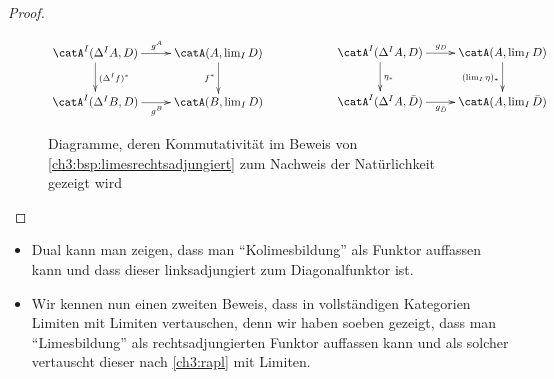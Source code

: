 \begin{proof}
\begin{figure}
        \begin{equation*}
            \begin{gathered}
                \xymatrix{
                    \catA^I(\Delta^I A, D) \ar[r]^{g^A} \ar[d]^{(\Delta^I f)^*} &
                    \catA(A, \lim_I D) \ar[d]_{f^*}
                    \\
                    \catA^I(\Delta^I B, D) \ar[r]_{g^B} & \catA(B, \lim_I D)
                }
            \end{gathered}
            \hspace{2cm}
            \begin{gathered}
                \xymatrix{
                    \catA^I(\Delta^I A, D) \ar[r]^{g_D} \ar[d]^{\eta_\ast} &
                    \catA(A, \lim_I D) \ar[d]_{(\lim_I\eta)_\ast}
                    \\
                    \catA^I(\Delta^I A, \bar D) \ar[r]_{g_{\bar D}} &
                    \catA(A, \lim_I\bar D)
                }
            \end{gathered}
        \end{equation*}
        \caption{Diagramme, deren Kommutativität im Beweis von
            \cref{ch3:bsp:limesrechtsadjungiert} zum Nachweis der Natürlichkeit
            gezeigt wird}
        \label{ch3:fig:limrechtsadjdiagramme}
    \end{figure}
\end{proof}

\begin{thBemerkung}\hfill
    \begin{itemize}
        \item
            Dual kann man zeigen, dass man \enquote{Kolimesbildung}
            als Funktor auffassen kann und dass dieser linksadjungiert
            zum Diagonalfunktor ist.
            
        \item
            Wir kennen nun einen zweiten Beweis, dass in vollständigen
            Kategorien Limiten mit Limiten vertauschen, denn wir haben
            soeben gezeigt, dass man \enquote{Limesbildung} als
            rechtsadjungierten Funktor auffassen kann und als solcher
            vertauscht dieser nach \cref{ch3:rapl} mit Limiten.
    \end{itemize}
\end{thBemerkung}
